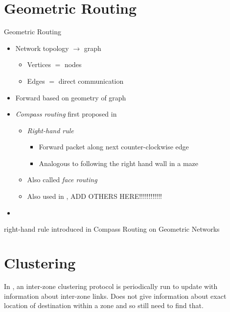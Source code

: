 \documentclass[pdftex]{beamer}
\begin{document}

\section{Geometric Routing}

\begin{frame}{Geometric Routing}
	\begin{itemize}
		\item Network topology $\rightarrow$ graph
			\begin{itemize}
				\item Vertices $=$ nodes
				\item Edges $=$ direct communication
			\end{itemize}
		\pause
		\item Forward based on geometry of graph
		\pause
		\item \emph{Compass routing} first proposed in \cite{Kranakis99compassrouting}
		\begin{itemize}
			\item \emph{Right-hand rule}
			\begin{itemize}
				\item Forward packet along next counter-clockwise edge
				\item Analogous to following the right hand wall in a maze
			\end{itemize}
			\item Also called \emph{face routing}
			\item Also used in \cite{Kuhn2003}, ADD OTHERS HERE!!!!!!!!!!!!
		\end{itemize}
		\item 
	\end{itemize}
right-hand rule 
introduced in Compass Routing on Geometric Networks
\end{frame}


\section{Clustering}

\begin{frame}
	
	In \cite{779923}, an inter-zone clustering protocol is periodically run to update with information about inter-zone links.
	Does not give information about exact location of destination within a zone and so still need to find that.
\end{frame}
\end{document}
